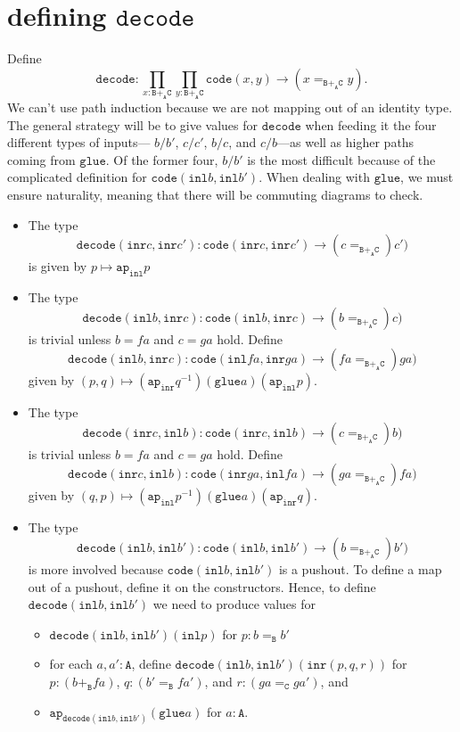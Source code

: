 \message{ !name(notes.tex)}\documentclass[12pt]{amsart}
\newcommand{\from}{\colon}
\newcommand{\type}[1]{\mathtt{#1}}
\newcommand{\A}{\type{A}}
\newcommand{\B}{\type{B}}
\newcommand{\C}{\type{C}}
\newcommand{\BAC}{\B +_{\A} \C}
\newcommand{\ap}{\type{ap}}
\newcommand{\inl}{\type{inl}}
\newcommand{\inr}{\type{inr}}
\newcommand{\glue}{\type{glue}}
\newcommand{\code}{\type{code}}
\newcommand{\decode}{\type{decode}}
\theoremstyle{remark}
\theoremstyle{definition}
\begin{document}
\pagebreak
\section{defining $\decode$}

Define 
\[ %
	\decode : 
	\prod_{x : \BAC} \prod_{y : \BAC} 
	\code (x,y) \to (x=_{\BAC} y).
\]
We can't use path induction because we are not mapping out of an
identity type. The general strategy will be to give values for $
\decode $ when feeding it the four different types of inputs--- $ b/b'
$, $ c/c' $, $ b/c $, and $ c/b $---as well as higher paths coming
from $ \glue $.  Of the former four, $ b/b' $ is the most difficult
because of the complicated definition for $ \code (\inl b , \inl b')
$.  When dealing with $ \glue $, we must ensure naturality, meaning
that there will be commuting diagrams to check.

\begin{itemize} 
	\item The type
	\[
		\decode ( \inr c , \inr c') \from 
		\code ( \inr c , \inr c' ) \to ( c =_{\B +_{\A} \C}) c' )
	\]
	is given by $ p \mapsto \ap_{\inl} p $
	\item The type 
	\[
		\decode ( \inl b , \inr c ) \from 
		\code ( \inl b , \inr c ) \to ( b =_{\B +_{\A} \C}) c )
	\]
	is trivial unless $ b = fa $ and $ c = ga $ hold. Define
	\[
		\decode ( \inl b , \inr c ) \from 
		\code ( \inl fa , \inr ga ) \to ( fa =_{\B +_{\A} \C}) ga )
	\]
	given by $ (p,q) \mapsto (\ap_{\inr} q^{-1}) (\glue a) (\ap_{\inl} p)$.
	\item The type 
	\[
		\decode ( \inr c , \inl b ) \from 
		\code ( \inr c , \inl b ) \to ( c =_{\B +_{\A} \C}) b )
	\]
	is trivial unless $ b = fa $ and $ c = ga $ hold. Define
	\[
		\decode ( \inr c , \inl b ) \from 
		\code ( \inr ga , \inl fa ) \to ( ga =_{\B +_{\A} \C}) fa )
	\]
	given by $ (q,p) \mapsto (\ap_{\inl} p^{-1}) (\glue a) (\ap_{\inr} q) $.
	\item The type 
	\[
		\decode ( \inl b , \inl b' ) \from 
		\code ( \inl b , \inl b' ) \to ( b =_{\B +_{\A} \C}) b' )
	\]
	is more involved because $ \code ( \inl b , \inl b' ) $ is a pushout.  To define a map out of a pushout, define it on the constructors.  Hence, to define $ \decode ( \inl b , \inl b' ) $ we need to produce values for
	\begin{itemize}
		\item $ \decode ( \inl b , \inl b' ) (\inl p) $ for $ p : b =_{\B} b' $
		\item for each $ a,a' : \A $, define $ \decode ( \inl b , \inl b' ) (\inr (p,q,r)) $ for $ p : (b +_{\B} fa) $, $ q : (b' =_{\B} fa') $, and $ r : (ga =_{\C} ga') $, and
		\item $ \ap_{\decode ( \inl b , \inl b' )} (\glue a)  $ for $ a : \A $.
	\end{itemize}
\end{itemize}
\end{document}
